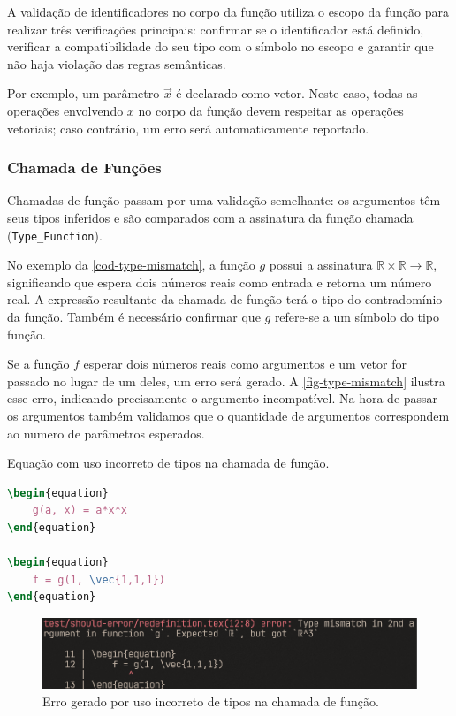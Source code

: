 A validação de identificadores no corpo da função utiliza o escopo da função para realizar três verificações principais: confirmar se o identificador está definido, verificar a compatibilidade do seu tipo com o símbolo no escopo e garantir que não haja violação das regras semânticas.

Por exemplo, um parâmetro $\vec{x}$ é declarado como vetor. Neste caso, todas as operações envolvendo $x$ no corpo da função devem respeitar as operações vetoriais; caso contrário, um erro será automaticamente reportado.

\subsubsection{Chamada de Funções}
Chamadas de função passam por uma validação semelhante: os argumentos têm seus tipos inferidos e são comparados com a assinatura da função chamada (\verb"Type_Function").

No exemplo da \autoref{cod-type-mismatch}, a função $g$ possui a assinatura $\mathbb{R} \times \mathbb{R} \to \mathbb{R}$, significando que espera dois números reais como entrada e retorna um número real. A expressão resultante da chamada de função terá o tipo do contradomínio da função. Também é necessário confirmar que $g$ refere-se a um símbolo do tipo função.

Se a função $f$ esperar dois números reais como argumentos e um vetor for passado no lugar de um deles, um erro será gerado. A \autoref{fig-type-mismatch} ilustra esse erro, indicando precisamente o argumento incompatível. Na hora de passar os argumentos também validamos que o quantidade de argumentos correspondem ao numero de parâmetros esperados.


\begin{codigo}[htb]
    \caption{\small Equação com uso incorreto de tipos na chamada de função. }
    \label{cod-type-mismatch}
\begin{lstlisting}[language=tex, numbers=none, frame=none, inputencoding=latin1]
\begin{equation}
    g(a, x) = a*x*x
\end{equation}

\begin{equation}
    f = g(1, \vec{1,1,1})
\end{equation}

\end{lstlisting}
\end{codigo}

\begin{figure}[H]
    \caption{\label{fig-type-mismatch} \small Erro gerado por uso incorreto de tipos na chamada de função.}
    \begin{center}
        \includegraphics[scale=0.5]{./Imagens/error-type-mismatch.png}
    \end{center}
\end{figure}


